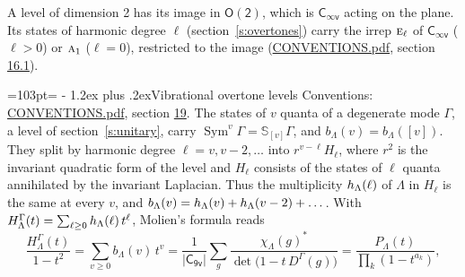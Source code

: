 \documentclass[10pt,a4paper]{article}
\makeatletter
\renewcommand\section{\@startsection{section}{1}{\z@}{-3ex plus -1ex minus -.2ex}%
  {1.2ex plus .2ex}{\normalfont\large\sffamily\bfseries\color{parttitle}}}
\newcommand{\needspace}[1]{\par\penalty-100\begingroup\dimen0=#1\relax\dimen2=\pagegoal
  \advance\dimen2-\pagetotal\ifdim\dimen0>\dimen2\relax\ifdim\dimen2>0pt\vfil\break\fi\fi
  \endgroup}
\numberwithin{equation}{section}
\newcommand{\grp}[1]{\mathsf{#1}}
\newcommand{\irr}[1]{\text{\normalfont\scshape #1}}
\newcommand{\repD}[1]{D^{#1}}
\newcommand{\irchar}[1]{\chi_{#1}}
\newcommand{\conj}[1]{{#1}^{*}}
\newcommand{\schur}[1]{\mathbb{S}_{#1}}
\newcommand{\shape}[1]{[#1]}
\makeatother
\begin{document}
A level of dimension 2 has its image in $\grp{O(2)}$, which is \href{Cinfv.pdf}{$\grp{C_{\infty v}}$} acting on the plane. \label{n:index.harmonic.degree}Its states of harmonic degree $\ell$ (section~\ref{s:overtones}) carry the irrep $\irr{e}_{\ell}$ of \href{Cinfv.pdf}{$\grp{C_{\infty v}}$} ($\ell > 0$) or $\irr{a}_{1}$ ($\ell = 0$), restricted to the image (\href{../../CONVENTIONS.pdf}{CONVENTIONS.pdf}, section \href{../../CONVENTIONS.pdf\#conv.16.1}{16.1}).
\needspace{103pt}
\section{Vibrational overtone levels}\label{s:overtones}
Conventions: \href{../../CONVENTIONS.pdf}{CONVENTIONS.pdf}, section \href{../../CONVENTIONS.pdf\#conv.19}{19}.
\leavevmode\label{n:index.quanta}\label{n:operator.symmetric.power}The states of $v$ quanta of a degenerate mode $\Gamma$, a level of section~\ref{s:unitary}, carry $\operatorname{Sym}^{v}\Gamma = \schur{\shape{v}}\Gamma$, and $b_\Lambda(v) = b_\Lambda(\shape{v})$. \label{n:local.quadratic.form}\label{n:set.harmonic}They split by harmonic degree $\ell = v, v - 2, \dots$ into $r^{v-\ell}H_\ell$, where $r^2$ is the invariant quadratic form of the level and $H_\ell$ consists of the states of $\ell$ quanta annihilated by the invariant Laplacian. \label{n:function.multiplicity.harmonic}Thus the multiplicity $\mathnormal{h}_\Lambda(\ell)$ of $\Lambda$ in $H_\ell$ is the same at every $v$, and $b_\Lambda(v) = \mathnormal{h}_\Lambda(v) + \mathnormal{h}_\Lambda(v - 2) + \dots$. \label{n:function.generating.level}With $H^{\Gamma}_\Lambda(t) = \sum_{\ell\ge0} \mathnormal{h}_\Lambda(\ell)\,t^{\ell}$, Molien's formula reads
\begin{equation}\label{e:molien}\frac{H^{\Gamma}_\Lambda(t)}{1 - t^2} = \sum_{v\ge0} b_\Lambda(v)\,t^v = \frac{1}{|\grp{C_{9v}}|}\sum_{g}\frac{\conj{\irchar{\Lambda}(g)}}{\det\bigl(1 - t\,\repD{\Gamma}(g)\bigr)} = \frac{P_\Lambda(t)}{\prod_k (1-t^{a_k})},\end{equation}
\end{document}
